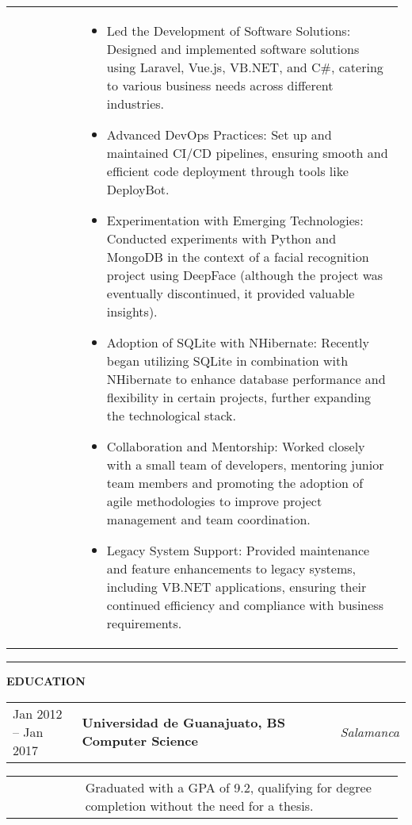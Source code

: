 \documentclass[letter,10pt]{article}
\begin{document}
\begin{tabular}{@{} p{0.18\linewidth} p{0.7965\linewidth} @{}}
&
\begin{itemize}[leftmargin=*, nosep]
	\item Led the Development of Software Solutions: Designed and implemented software solutions using Laravel, Vue.js, VB.NET, and C\#, catering to various business needs across different industries.
 	\item Advanced DevOps Practices: Set up and maintained CI/CD pipelines, ensuring smooth and efficient code deployment through tools like DeployBot.
  	\item Experimentation with Emerging Technologies: Conducted experiments with Python and MongoDB in the context of a facial recognition project using DeepFace (although the project was eventually discontinued, it provided valuable insights).
  	\item Adoption of SQLite with NHibernate: Recently began utilizing SQLite in combination with NHibernate to enhance database performance and flexibility in certain projects, further expanding the technological stack.
 	\item Collaboration and Mentorship: Worked closely with a small team of developers, mentoring junior team members and promoting the adoption of agile methodologies to improve project management and team coordination.
  	\item Legacy System Support: Provided maintenance and feature enhancements to legacy systems, including VB.NET applications, ensuring their continued efficiency and compliance with business requirements.
\end{itemize}
\end{tabular}
\vspace{-0.5mm}

\rule{\linewidth}{0.5pt}
\vspace{-4.28mm}
\par
\textbf{EDUCATION}
\vspace{3mm}

\begin{tabular}{@{} p{0.18\linewidth} p{0.685\linewidth} p{0.2\linewidth} @{}}
Jan 2012 -- Jan 2017 & \textbf{Universidad de Guanajuato, BS Computer Science}  & \textit{Salamanca}
\end{tabular}
\vspace{-3mm}
\par
\begin{tabular}{@{} p{0.18\linewidth} p{0.7972\linewidth} @{}}
&
\vspace{-4.1mm}
Graduated with a GPA of 9.2, qualifying for degree completion without the need for a thesis.
\end{tabular}
\end{document}
